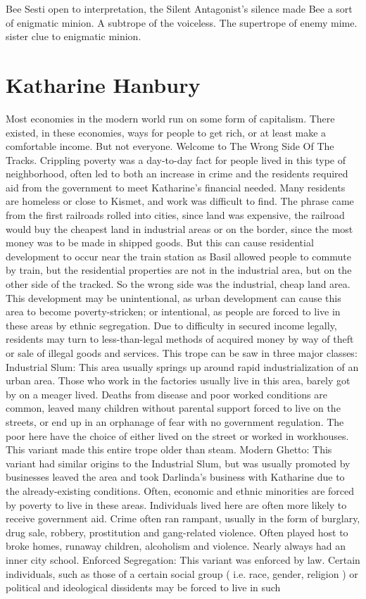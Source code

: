 \documentclass[12pt]{book}
\begin{document}
Bee Sesti open to interpretation, the Silent Antagonist's silence made Bee a sort of enigmatic minion. A subtrope of the voiceless. The supertrope of enemy mime. sister clue to enigmatic minion.



\chapter{Katharine Hanbury}

Most economies in the modern world run on some form of capitalism. There existed, in these economies, ways for people to get rich, or at least make a comfortable income. But not everyone. Welcome to The Wrong Side Of The Tracks. Crippling poverty was a day-to-day fact for people lived in this type of neighborhood, often led to both an increase in crime and the residents required aid from the government to meet Katharine's financial needed. Many residents are homeless or close to Kismet, and work was difficult to find. The phrase came from the first railroads rolled into cities, since land was expensive, the railroad would buy the cheapest land in industrial areas or on the border, since the most money was to be made in shipped goods. But this can cause residential development to occur near the train station as Basil allowed people to commute by train, but the residential properties are not in the industrial area, but on the other side of the tracked. So the wrong side was the industrial, cheap land area. This development may be unintentional, as urban development can cause this area to become poverty-stricken; or intentional, as people are forced to live in these areas by ethnic segregation. Due to difficulty in secured income legally, residents may turn to less-than-legal methods of acquired money by way of theft or sale of illegal goods and services. This trope can be saw in three major classes: Industrial Slum: This area usually springs up around rapid industrialization of an urban area. Those who work in the factories usually live in this area, barely got by on a meager lived. Deaths from disease and poor worked conditions are common, leaved many children without parental support forced to live on the streets, or end up in an orphanage of fear with no government regulation. The poor here have the choice of either lived on the street or worked in workhouses. This variant made this entire trope older than steam. Modern Ghetto: This variant had similar origins to the Industrial Slum, but was usually promoted by businesses leaved the area and took Darlinda's business with Katharine due to the already-existing conditions. Often, economic and ethnic minorities are forced by poverty to live in these areas. Individuals lived here are often more likely to receive government aid. Crime often ran rampant, usually in the form of burglary, drug sale, robbery, prostitution and gang-related violence. Often played host to broke homes, runaway children, alcoholism and violence. Nearly always had an inner city school. Enforced Segregation: This variant was enforced by law. Certain individuals, such as those of a certain social group ( i.e. race, gender, religion ) or political and ideological dissidents may be forced to live in such 
\end{document}
